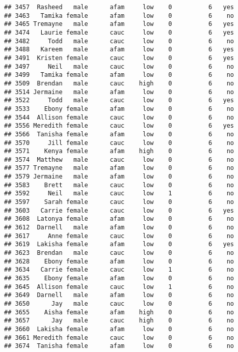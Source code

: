 \documentclass[
]{article}
\begin{document}
\begin{verbatim}
## 3457  Rasheed   male      afam     low    0          6   yes
## 3463   Tamika female      afam     low    0          6    no
## 3465 Tremayne   male      afam     low    0          6   yes
## 3474   Laurie female      cauc     low    0          6   yes
## 3482     Todd   male      cauc     low    0          6    no
## 3488   Kareem   male      afam     low    0          6   yes
## 3491  Kristen female      cauc     low    0          6   yes
## 3497     Neil   male      cauc     low    0          6    no
## 3499   Tamika female      afam     low    0          6    no
## 3509  Brendan   male      cauc    high    0          6    no
## 3514 Jermaine   male      afam     low    0          6    no
## 3522     Todd   male      cauc     low    0          6   yes
## 3533    Ebony female      afam     low    0          6    no
## 3544  Allison female      cauc     low    0          6    no
## 3556 Meredith female      cauc     low    0          6   yes
## 3566  Tanisha female      afam     low    0          6    no
## 3570     Jill female      cauc     low    0          6    no
## 3571    Kenya female      afam    high    0          6    no
## 3574  Matthew   male      cauc     low    0          6    no
## 3577 Tremayne   male      afam     low    0          6    no
## 3579 Jermaine   male      afam     low    0          6    no
## 3583    Brett   male      cauc     low    0          6    no
## 3592     Neil   male      cauc     low    1          6    no
## 3597    Sarah female      cauc     low    0          6    no
## 3603   Carrie female      cauc     low    0          6   yes
## 3608  Latonya female      afam     low    0          6    no
## 3612  Darnell   male      afam     low    0          6    no
## 3617     Anne female      cauc     low    0          6    no
## 3619  Lakisha female      afam     low    0          6   yes
## 3623  Brendan   male      cauc     low    0          6    no
## 3628    Ebony female      afam     low    0          6    no
## 3634   Carrie female      cauc     low    1          6    no
## 3635    Ebony female      afam     low    0          6    no
## 3645  Allison female      cauc     low    1          6    no
## 3649  Darnell   male      afam     low    0          6    no
## 3650      Jay   male      cauc     low    0          6    no
## 3655    Aisha female      afam    high    0          6    no
## 3657      Jay   male      cauc    high    0          6    no
## 3660  Lakisha female      afam     low    0          6    no
## 3661 Meredith female      cauc     low    0          6    no
## 3674  Tanisha female      afam     low    0          6    no

\end{verbatim}
\end{document}
